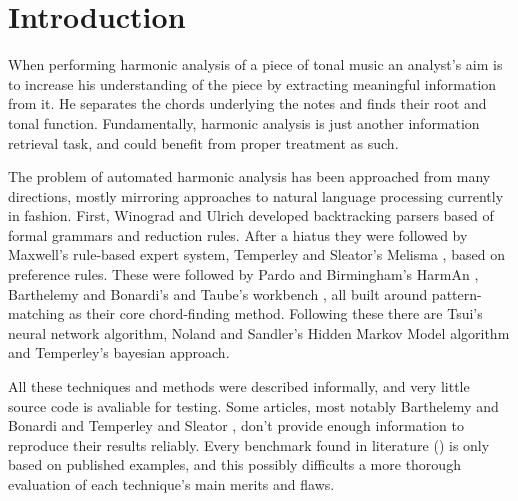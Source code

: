 \documentclass{article}
\title{}
\begin{document}
\graphicspath{{figs/}{data/}}
\maketitle

\begin{abstract}
\end{abstract}

\section{Introduction}
\label{sec:introduction}


When performing harmonic analysis of a piece of tonal music an
analyst's aim is to increase his understanding of the piece by
extracting meaningful information from it.  He separates the chords
underlying the notes and finds their root and tonal function.
Fundamentally, harmonic analysis is just another information retrieval
task, and could benefit from proper treatment as such.

The problem of automated harmonic analysis has been approached from
many directions, mostly mirroring approaches to natural language
processing currently in fashion.  First, Winograd
\cite{winograd:linguistics} and Ulrich \cite{ulrich:analysis}
developed backtracking parsers based of formal grammars and reduction
rules.  After a hiatus they were followed by Maxwell's
\cite{maxwell:expert} rule-based expert system, Temperley and
Sleator's Melisma \cite{temperley.ea:modeling}, based on preference
rules.  These were followed by Pardo and Birmingham's HarmAn
\cite{pardo.ea:automated}, Barthelemy and Bonardi's
\cite{barthelemy.ea:figured} and Taube's workbench
\cite{taube:automatic}, all built around pattern-matching as their
core chord-finding method.  Following these there are Tsui's
\cite{tsui:harmonic} neural network algorithm, Noland and Sandler's
\cite{noland.ea:key} Hidden Markov Model algorithm and Temperley's
\cite{temperley:bayesian} bayesian approach.

All these techniques and methods were described informally, and very
little source code is avaliable for testing.  Some articles, most
notably Barthelemy and Bonardi \cite{barthelemy.ea:figured} and
Temperley and Sleator \cite{temperley.ea:modeling}, don't
provide enough information to reproduce their results reliably.  Every
benchmark found in literature (\cite{pardo.ea:automated,
  barthelemy.ea:figured, tsui:harmonic, taube:automatic,
  illescas.ea:harmonic}) is only based on published examples, and this
possibly difficults a more thorough evaluation of each technique's
main merits and flaws.
\end{document}
